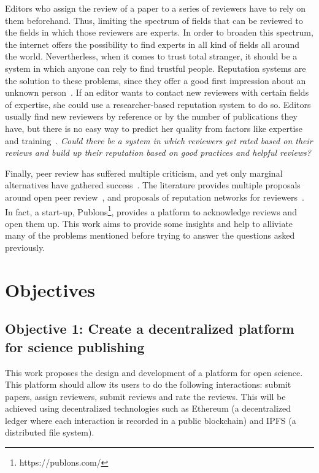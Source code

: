Editors who assign the review of a paper to a series of reviewers have
to rely on them beforehand. Thus, limiting the spectrum of fields that can be
reviewed to the fields in which those reviewers are experts. In order to broaden
this spectrum, the internet offers the possibility to find experts in all kind
of fields all around the world. Nevertherless, when it comes to trust total
stranger, it should be a system in which anyone can rely to find trustful
people. Reputation systems are the solution to these problems, since they offer
a good first impression about an unknown person~\cite{resnick2000reputation}. If
an editor wants to contact new reviewers with certain fields of expertise, she
could use a researcher-based reputation system to do so. Editors usually find
new reviewers by reference or by the number of publications they have, but there
is no easy way to predict her quality from factors like expertise and
training~\cite{callaham_relationship_2007}. \emph{Could there be a system in
  which reviewers get rated based on their reviews and build up their reputation
  based on good practices and helpful reviews?}

Finally, peer review has suffered multiple criticism, and yet only marginal
alternatives have gathered success~\cite{ware2008peer}. The literature provides
multiple proposals around open peer review~\cite{ford2013defining}, and
proposals of reputation networks for reviewers~\cite{frishauf2009reputation}. In
fact, a start-up, Publons\footnote{https://publons.com/}, provides a platform to
acknowledge reviews and open them up. This work aims to provide some insights
and help to alliviate many of the problems mentioned before trying to answer the
questions asked previously.

\section{Objectives}
\label{sec:objectives}
\subsection*{Objective 1: Create a decentralized platform for science
  publishing}

This work proposes the design and development of a platform for open science.
This platform should allow its users to do the following interactions: submit
papers, assign reviewers, submit reviews and rate the reviews. This will be
achieved using decentralized technologies such as Ethereum (a decentralized
ledger where each interaction is recorded in a public blockchain) and IPFS (a
distributed file system).

